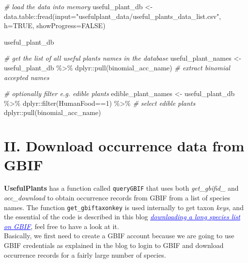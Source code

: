 \documentclass[
]{article}
\newenvironment{Shaded}{\begin{snugshade}}{\end{snugshade}}
\newcommand{\AttributeTok}[1]{\textcolor[rgb]{0.77,0.63,0.00}{#1}}
\newcommand{\CommentTok}[1]{\textcolor[rgb]{0.56,0.35,0.01}{\textit{#1}}}
\newcommand{\ConstantTok}[1]{\textcolor[rgb]{0.00,0.00,0.00}{#1}}
\newcommand{\DecValTok}[1]{\textcolor[rgb]{0.00,0.00,0.81}{#1}}
\newcommand{\FunctionTok}[1]{\textcolor[rgb]{0.00,0.00,0.00}{#1}}
\newcommand{\NormalTok}[1]{#1}
\newcommand{\OtherTok}[1]{\textcolor[rgb]{0.56,0.35,0.01}{#1}}
\newcommand{\SpecialCharTok}[1]{\textcolor[rgb]{0.00,0.00,0.00}{#1}}
\newcommand{\StringTok}[1]{\textcolor[rgb]{0.31,0.60,0.02}{#1}}
\begin{document}
\begin{Shaded}
\begin{Highlighting}[]

\CommentTok{\# load the data into memory}
\NormalTok{useful\_plant\_db }\OtherTok{\textless{}{-}}\NormalTok{ data.table}\SpecialCharTok{::}\FunctionTok{fread}\NormalTok{(}\AttributeTok{input=}\StringTok{"usefulplant\_data/useful\_plants\_data\_list.csv"}\NormalTok{,}
                                     \AttributeTok{h=}\ConstantTok{TRUE}\NormalTok{,}
                                     \AttributeTok{showProgress=}\ConstantTok{FALSE}\NormalTok{)}

\NormalTok{useful\_plant\_db}

\CommentTok{\# get the list of all useful plants names in the database}
\NormalTok{useful\_plant\_names }\OtherTok{\textless{}{-}}\NormalTok{ useful\_plant\_db }\SpecialCharTok{\%\textgreater{}\%}
\NormalTok{  dplyr}\SpecialCharTok{::}\FunctionTok{pull}\NormalTok{(binomial\_acc\_name) }\CommentTok{\# extract binomial accepted names}

\CommentTok{\# optionally filter e.g. edible plants}
\NormalTok{edible\_plant\_names }\OtherTok{\textless{}{-}}\NormalTok{ useful\_plant\_db }\SpecialCharTok{\%\textgreater{}\%}
\NormalTok{  dplyr}\SpecialCharTok{::}\FunctionTok{filter}\NormalTok{(HumanFood}\SpecialCharTok{==}\DecValTok{1}\NormalTok{) }\SpecialCharTok{\%\textgreater{}\%}         \CommentTok{\# select edible plants}
\NormalTok{  dplyr}\SpecialCharTok{::}\FunctionTok{pull}\NormalTok{(binomial\_acc\_name)          }
\end{Highlighting}
\end{Shaded}

\hypertarget{ii.-download-occurrence-data-from-gbif}{%
\section{II. Download occurrence data from
GBIF}\label{ii.-download-occurrence-data-from-gbif}}

\textbf{UsefulPlants} has a function called \texttt{queryGBIF} that uses
both \emph{get\_gbifid\_} and \emph{occ\_download} to obtain occurrence
records from GBIF from a list of species names. The function
\texttt{get\_gbiftaxonkey} is used internally to get taxon \emph{keys},
and the essential of the code is described in this blog
\href{https://data-blog.gbif.org/post/downloading-long-species-lists-on-gbif/}{\emph{\textcolor{blue}{\underline{downloading a long species list on GBIF}}}},
feel free to have a look at it.\\
Basically, we first need to create a GBIF account because we are going
to use GBIF credentials as explained in the blog to login to GBIF and
download occurrence records for a fairly large number of species.
\end{document}
